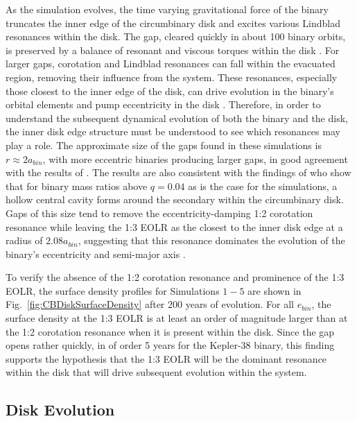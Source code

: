 As the simulation evolves, the time varying gravitational force of the
binary truncates the inner edge of the circumbinary disk and excites
various Lindblad resonances within the disk.  The gap, cleared quickly
in about 100 binary orbits, is preserved by a balance of resonant and
viscous torques within the disk \citep{Artymowicz1994}.  For larger gaps,
corotation and Lindblad resonances can fall within the evacuated
region, removing their influence from the system.  These resonances,
especially those closest to the inner edge of the disk, can drive
evolution in the binary's orbital elements \citep{Goldreich1980,Artymowicz1991} and
pump eccentricity in the disk \citep{Papaloizou2001}.  Therefore, in
order to understand the subsequent dynamical evolution of both the
binary and the disk, the inner disk edge structure must be understood to see which
resonances may play a role.  The approximate size of the gaps found in
these simulations is $r \approx 2 a_{bin}$, with more eccentric binaries
producing larger gaps, in good agreement with the results of
\citet{Artymowicz1994}.  The results are also consistent with the findings of \citet{DOrazio2016} who show that for binary mass ratios above $q = 0.04$ as is the case 
for the simulations, a hollow central cavity forms around the secondary within the circumbinary disk.  Gaps of this size tend to remove the eccentricity-damping 
1:2 corotation resonance while leaving the 1:3 EOLR as the closest to the inner disk edge at a radius of $2.08 a_{bin}$, suggesting that this resonance 
dominates the evolution of the binary's eccentricity and semi-major axis \citep{Artymowicz1991,Artymowicz1992,Papaloizou2001}.

To verify the absence of the 1:2 corotation resonance and prominence
of the 1:3 EOLR, the surface density profiles for Simulations $1-5$
are shown in Fig.~\ref{fig:CBDiskSurfaceDensity} after 200 years of evolution.
For all $e_{bin}$, the surface density at the 1:3 EOLR is at least an
order of magnitude larger than at the 1:2 corotation resonance when it
is present within the disk.  Since the gap opens rather quickly, in of order 5 years for the Kepler-38 binary,  this finding supports the hypothesis that the 1:3 EOLR will be the dominant resonance within the disk that will drive subsequent evolution within the system.


\subsection{Disk Evolution}

